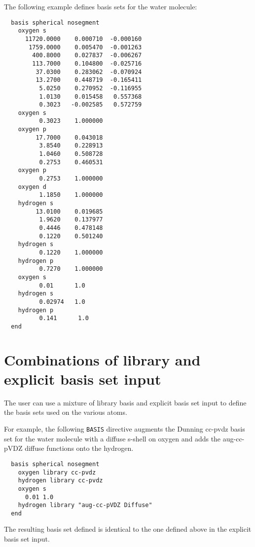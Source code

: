 The following example defines basis sets for the water molecule:
\begin{verbatim}
  basis spherical nosegment
    oxygen s
      11720.0000    0.000710  -0.000160
       1759.0000    0.005470  -0.001263
        400.8000    0.027837  -0.006267
        113.7000    0.104800  -0.025716
         37.0300    0.283062  -0.070924
         13.2700    0.448719  -0.165411
          5.0250    0.270952  -0.116955
          1.0130    0.015458   0.557368
          0.3023   -0.002585   0.572759
    oxygen s                
          0.3023    1.000000
    oxygen p                
         17.7000    0.043018
          3.8540    0.228913
          1.0460    0.508728
          0.2753    0.460531
    oxygen p                
          0.2753    1.000000
    oxygen d
          1.1850    1.000000
    hydrogen s
         13.0100    0.019685
          1.9620    0.137977
          0.4446    0.478148
          0.1220    0.501240
    hydrogen s  
          0.1220    1.000000
    hydrogen p  
          0.7270    1.000000
    oxygen s
          0.01      1.0
    hydrogen s
          0.02974   1.0
    hydrogen p
          0.141      1.0
  end
\end{verbatim}


\section{Combinations of library and explicit basis set input}
The user can use a mixture of library basis and explicit basis set
input to define the basis sets used on the various atoms.

For example, the following \verb+BASIS+ directive augments the Dunning
cc-pvdz basis set for the water molecule with a diffuse s-shell on
oxygen and adds the aug-cc-pVDZ diffuse functions onto the hydrogen.
\begin{verbatim}
  basis spherical nosegment
    oxygen library cc-pvdz
    hydrogen library cc-pvdz
    oxygen s
      0.01 1.0
    hydrogen library "aug-cc-pVDZ Diffuse"
  end
\end{verbatim}

The resulting basis set defined is identical to the one defined above 
in the explicit basis set input.

